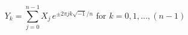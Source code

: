 \documentclass[a4paper, 12pt]{article}
\begin{document}
\begin{equation*}
Y_k = \sum\limits_{j=0}^{n-1} X_j \, e^{\pm 2 \pi j k \sqrt{-1}/n} \textrm{ for } k=0,1,...,(n-1)
\end{equation*}
\end{document}
